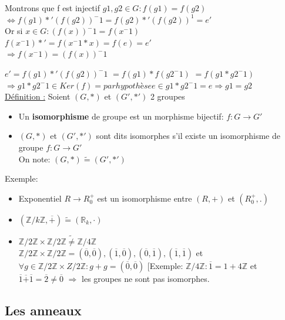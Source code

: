 \documentclass[11pt]{article}
\begin{document}
				Montrons que f est injectif
				$g1, g2 \in G: f(g1) = f(g2)$
		$\Leftrightarrow f(g1) *' (f(g2))^-1 = f(g2) *' (f(g2))^1 = e'$ \\
		Or si $x \in G: (f(x))^-1 = f(x^-1)$ \\
			$f(x^-1) *' = f(x^-1 * x) = f(e) = e'$ \\
			$\Rightarrow f(x^-1) = (f(x))^-1$
			
			$e' = f(g1) *' (f(g2))^-1$
			$= f(g1) * f(g2^-1)$
			$= f(g1 * g2^-1)$
			$\Rightarrow g1 * g2^-1 \in Ker(f) = par hypothèse {e} \in g1 * g2^-1 = e \Rightarrow g1 = g2$\\
			
			\underline{Définition :} Soient $(G, *)$ et $(G', *')$ 2 groupes
				\begin{itemize}
		 			\item Un \textbf{isomorphisme} de groupe est un morphisme bijectif: $f: G \rightarrow G'$
		 			\item $(G, *)$ et $(G', *')$ sont dits isomorphes s'il existe un isomorphisme de groupe $f: G \rightarrow G'$\\
		 		On note: $(G, *) \tilde{=} (G', *')$
				\end{itemize}
			Exemple: 
			\begin{itemize}
			 	\item Exponentiel $R \rightarrow R_0^+$ est un isomorphisme entre $(R, +)$ et $(R_0^+, .)$
			 	\item $(\mathbb Z/k\mathbb Z, \overline{+}) \tilde{=} (\mathbb R_k, \cdot)$
			 	\item $\mathbb Z/2\mathbb Z \times \mathbb Z/2\mathbb Z \tilde{\neq} \mathbb Z/4\mathbb Z$\\
				$\mathbb Z/2\mathbb Z \times \mathbb Z/2\mathbb Z = {(\overline{0}, \overline{0}), (\overline{1}, \overline{0}), (\overline{0}, \overline{1}), (\overline{1}, \overline{1})}$ et $\forall g \in \mathbb Z/2\mathbb Z \times Z/2\mathbb Z : g + g = (\overline{0}, \overline{0})$
				[Exemple: 
				$\mathbb Z/4\mathbb Z: \overline{1} = 1 + 4\mathbb Z$ et $\overline{1} \overline{+} \overline{1} = \overline{2} \neq \overline{0}$
				$\Rightarrow$ les groupes ne sont pas isomorphes.
			\end{itemize}
		
		\subsection{Les anneaux}
\end{document}
